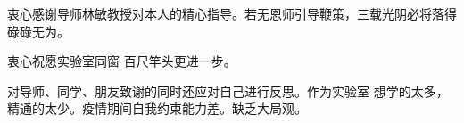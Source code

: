 \begin{acknowledgement}
    衷心感谢导师林敏教授对本人的精心指导。若无恩师引导鞭策，三载光阴必将落得碌碌无为。

    衷心祝愿实验室同窗 百尺竿头更进一步。

    对导师、同学、朋友致谢的同时还应对自己进行反思。作为实验室 想学的太多，精通的太少。疫情期间自我约束能力差。缺乏大局观。
\end{acknowledgement}
